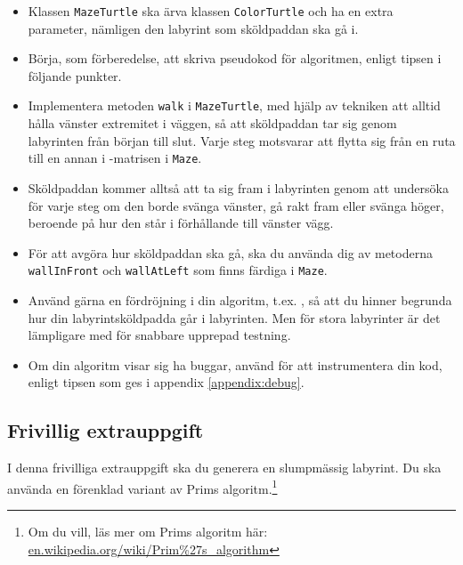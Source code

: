 \begin{itemize}
\item Klassen \texttt{MazeTurtle} ska ärva klassen \texttt{ColorTurtle} och ha en extra parameter, nämligen den labyrint som sköldpaddan ska gå i.

\item Börja, som förberedelse, att skriva pseudokod för algoritmen, enligt tipsen i följande punkter.

\item Implementera metoden \texttt{walk} i \texttt{MazeTurtle}, med hjälp av tekniken att alltid hålla vänster extremitet i väggen, så att sköldpaddan tar sig genom labyrinten från början till slut. Varje steg motsvarar att flytta sig från en ruta till en annan i -matrisen i \texttt{Maze}.

\item Sköldpaddan kommer alltså att ta sig fram i labyrinten genom att undersöka för varje steg om den borde svänga vänster, gå rakt fram eller svänga höger, beroende på hur den står i förhållande till vänster vägg.

\item För att avgöra hur sköldpaddan ska gå, ska du använda dig av metoderna \texttt{wallInFront} och \texttt{wallAtLeft} som finns färdiga i \texttt{Maze}.

\item Använd gärna en fördröjning i din algoritm, t.ex. , så att du hinner begrunda hur din labyrintsköldpadda går i labyrinten. Men för stora labyrinter är det lämpligare med  för snabbare upprepad testning.

\item Om din algoritm visar sig ha buggar, använd  för att instrumentera din kod, enligt tipsen som ges i appendix \ref{appendix:debug}.

\end{itemize}

\clearpage

\subsection{Frivillig extrauppgift}

I denna frivilliga extrauppgift ska du generera en slumpmässig labyrint. Du ska använda en förenklad variant av Prims algoritm.\footnote{Om du vill, läs mer om Prims algoritm här: \href{https://en.wikipedia.org/wiki/Prim\%27s_algorithm}{en.wikipedia.org/wiki/Prim\%27s\_algorithm}}

